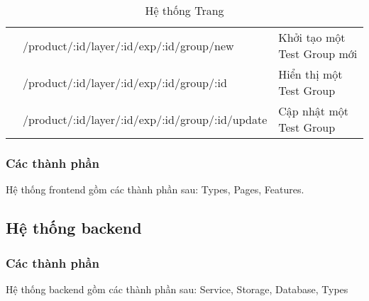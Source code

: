 \begin{table}[H]
\begin{tabular}{|c|l|p{5cm}|}
		                            & /product/:id/layer/:id/exp/:id/group/new        & Khởi tạo một Test Group mới                    \\ \cline{2-3}
		                            & /product/:id/layer/:id/exp/:id/group/:id        & Hiển thị một Test Group                        \\ \cline{2-3}
		                            & /product/:id/layer/:id/exp/:id/group/:id/update & Cập nhật một Test Group                        \\ \hline
	\end{tabular}
	\caption{Hệ thống Trang}
\end{table}

\subsubsection{Các thành phần}

Hệ thống frontend gồm các thành phần sau: Types, Pages, Features.

\begin{itemize}
\end{itemize}

\subsection{Hệ thống backend}

\subsubsection{Các thành phần}

Hệ thống backend gồm các thành phần sau: Service, Storage, Database, Types

